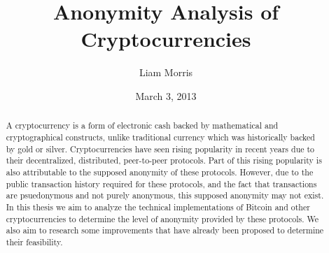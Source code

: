 \documentclass[11pt]{article}
\begin{document}
\begin{titlepage}
\title{Anonymity Analysis of Cryptocurrencies}
\author{Liam Morris \\
  }
\date{March 3, 2013}
\end{titlepage}
\maketitle
\vfill
\begin{abstract}
A cryptocurrency is a form of electronic cash backed by mathematical and
cryptographical constructs, unlike traditional currency which was historically
backed by gold or silver. Cryptocurrencies have seen rising popularity in recent
years due to their decentralized, distributed, peer-to-peer protocols. Part of
this rising popularity is also attributable to the supposed anonymity of these
protocols. However, due to the public transaction history required for these
protocols, and the fact that transactions are psuedonymous and not purely
anonymous, this supposed anonymity may not exist. In this thesis we aim to
analyze the technical implementations of Bitcoin and other cryptocurrencies to
determine the level of anonymity provided by these protocols. We also aim to
research some improvements that have already been proposed to determine their
feasibility.
\end{abstract}
\thispagestyle{empty}
\clearpage
{}
\tableofcontents
\listoffigures
\pagebreak
\end{document}
